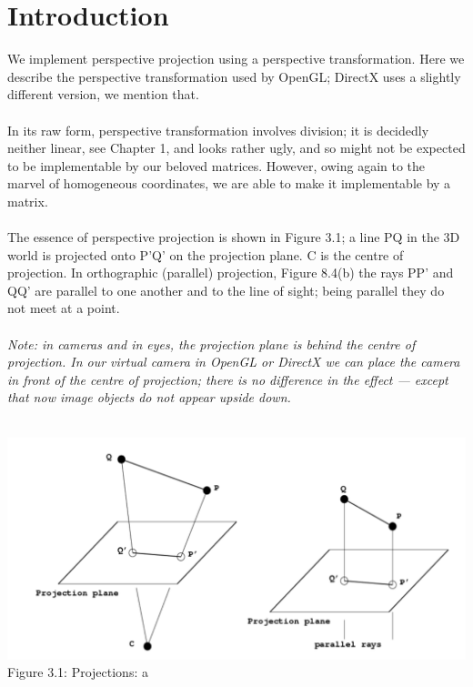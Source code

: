 \documentclass[
11pt, %
english, %
singlespacing, %
headsepline, %
]{MastersDoctoralThesis} %
\begin{document}
\section{Introduction}
We implement perspective projection using a perspective transformation. Here we describe the perspective transformation used by OpenGL; DirectX uses a slightly different version, we mention that. \\ \\
In its raw form, perspective transformation involves division; it is decidedly neither linear, see Chapter 1, and looks rather ugly, and so might not be expected to be implementable by our beloved matrices. However, owing again to the marvel of homogeneous coordinates, we are able to make it implementable by a matrix. \\ \\
The essence of perspective projection is shown in Figure 3.1; a line PQ in the 3D world is projected onto P’Q’ on the projection plane. C is the centre of projection. In orthographic (parallel) projection, Figure 8.4(b) the rays PP’ and QQ’ are parallel to one another and to the line of sight; being parallel they do not meet at a point. \\ \\
\emph{Note: in cameras and in eyes, the projection plane is behind the centre of projection. In our virtual camera in OpenGL or DirectX we can place the camera in front of the centre of projection; there is no difference in the effect — except that now image objects do not appear upside down.}
\\ \\
\begin{center}
\includegraphics[width=\textwidth]{3-1}
\\ Figure 3.1: Projections: a
\end{center}
\end{document}
